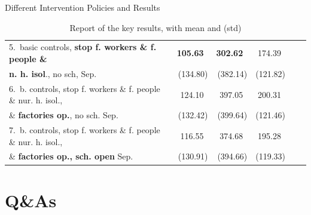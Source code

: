 \documentclass[8pt]{beamer}
\begin{document}
\begin{frame}{Different Intervention Policies and Results}
\begin{table}[H]
\begin{tabular}{lrrrrr}
5.~basic controls, \textbf{stop f. workers \&  f. people \&}    & \textbf{{\color{orange}105.63}}~    &  \textbf{{\color{orange}302.62}}~      &  174.39~   \\
\textbf{ n. h. isol}., no sch, Sep.                                              &   (134.80)   &     (382.14)          &  (121.82) \\
 \midrule
6.~b. controls, stop f. workers \&  f. people \& nur. h. isol.,  &  124.10~    &    397.05~           &  200.31~    \\
\& \textbf{factories op.}, no sch. Sep.                                               &  (132.42)   &    (399.64)           &  (121.46) \\
\midrule
7.~b. controls, stop f. workers  \&  f. people \& nur. h. isol.,   &  116.55~   &    374.68~           &  195.28~    \\
 \& \textbf{factories op., sch. open} Sep.                                            &  (130.91) &     (394.66)           &  (119.33) \\
\bottomrule
\end{tabular}
\caption{Report of the key results, with mean and (std)}
\label{keyResultsT}
\end{table}



\end{frame}

\section{Q\&As}
\end{document}
